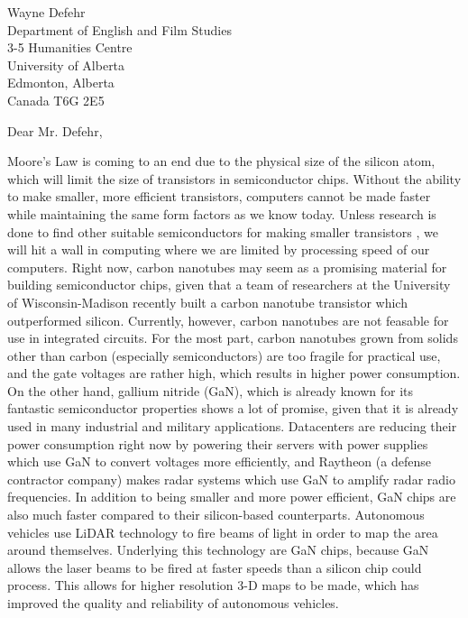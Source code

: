 \documentclass[letterpaper]{letter}
\begin{document}
\begin{letter}
{
Wayne Defehr\\
Department of English and Film Studies\\
3-5 Humanities Centre\\
University of Alberta\\
Edmonton, Alberta\\
Canada T6G 2E5\\
}

\opening{Dear Mr. Defehr,}
\doublespacing

Moore's Law is coming to an end due to the physical size of the silicon atom,
which will limit the size of transistors in semiconductor chips. Without the
ability to make smaller, more efficient transistors, computers cannot be made
faster while maintaining the same form factors as we know today. Unless research
is done to find other suitable semiconductors for making smaller transistors ,
we will hit a wall in computing where we are limited by processing speed of our
computers. Right now, carbon nanotubes may seem as a promising material for
building semiconductor chips, given that a team of researchers at the University
of Wisconsin-Madison recently built a carbon nanotube transistor which
outperformed silicon. Currently, however, carbon nanotubes are not feasable for
use in integrated circuits. For the most part, carbon nanotubes grown from
solids other than carbon (especially semiconductors) are too fragile for
practical use, and the gate voltages are rather high, which results in higher
power consumption. On the other hand, gallium nitride (GaN), which is already
known for its fantastic semiconductor properties shows a lot of promise, given
that it is already used in many industrial and military applications.
Datacenters are reducing their power consumption right now by powering their
servers with power supplies which use GaN to convert voltages more efficiently,
and Raytheon (a defense contractor company) makes radar systems which use GaN to
amplify radar radio frequencies. In addition to being smaller and more power
efficient, GaN chips are also much faster compared to their silicon-based
counterparts. Autonomous vehicles use LiDAR technology to fire beams of light in
order to map the area around themselves. Underlying this technology are GaN
chips, because GaN allows the laser beams to be fired at faster speeds than a
silicon chip could process. This allows for higher resolution 3-D maps to be
made, which has improved the quality and reliability of autonomous vehicles.

\end{letter}
\end{document}
